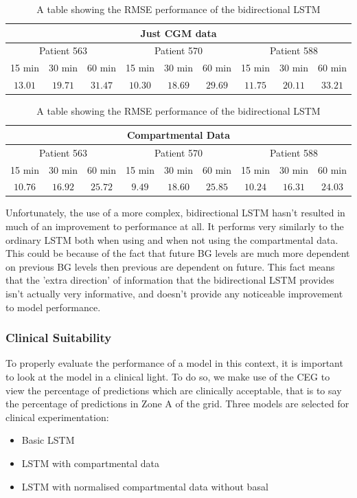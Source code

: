     \begin{table}[H]
      \centering
      \caption{A table showing the RMSE performance of the bidirectional LSTM}
      \begin{tabular}{|*{9}{c|}} 
        \hline
        \multicolumn{9}{|c|}{Just CGM data} \\ \hline
        \multicolumn{3}{|c}{Patient 563} & \multicolumn{3}{|c}{Patient 570} & \multicolumn{3}{|c|}{Patient 588} \\ \hline 
        15 min & 30 min & 60 min &15 min & 30 min & 60 min &15 min & 30 min & 60 min \\ \hline
        $13.01$&$19.71$ &$31.47$ &$10.30$ &$18.69$ & $29.69$&$11.75$ &$20.11$ &$33.21$ \\ \hline
      \end{tabular}
      \begin{tabular}{|*{9}{c|}} 
        \hline
        \multicolumn{9}{|c|}{Compartmental Data} \\ \hline
        \multicolumn{3}{|c}{Patient 563} & \multicolumn{3}{|c}{Patient 570} & \multicolumn{3}{|c|}{Patient 588} \\ \hline 
        15 min & 30 min & 60 min &15 min & 30 min & 60 min &15 min & 30 min & 60 min \\ \hline
        $10.76$ &$16.92$ &$25.72$ &$9.49$ &$18.60$ &$25.85$ &$10.24$&$16.31$ &$24.03$ \\ \hline
      \end{tabular}
    \end{table}

    Unfortunately, the use of a more complex, bidirectional LSTM hasn't resulted in much of an improvement to performance at all. It performs very similarly to the ordinary LSTM both when using and when not using the compartmental data. This could be because of the fact that future BG levels are much more dependent on previous BG levels then previous are dependent on future. This fact means that the 'extra direction' of information that the bidirectional LSTM provides isn't actually very informative, and doesn't provide any noticeable improvement to model performance.
	
    \subsubsection{Clinical Suitability}
    To properly evaluate the performance of a model in this context, it is important to look at the model in a clinical light. To do so, we make use of the CEG \cite{CEGA} to view the percentage of predictions which are clinically acceptable, that is to say the percentage of predictions in Zone A of the grid. Three models are selected for clinical experimentation:
    \begin{itemize}
      \item Basic LSTM
      \item LSTM with compartmental data
      \item LSTM with normalised compartmental data without basal
    \end{itemize}

